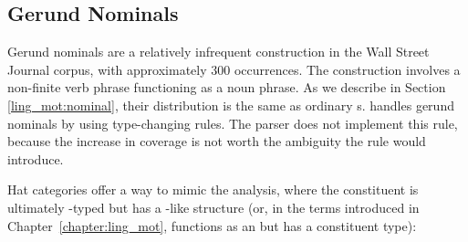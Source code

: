 \subsection{Gerund Nominals}

Gerund nominals are a relatively infrequent construction in the Wall Street
Journal corpus, with approximately 300 occurrences. The construction involves a
non-finite verb phrase functioning as a noun phrase. As we describe in Section
\ref{ling_mot:nominal}, their distribution is the same as ordinary s.
\ccgbank handles gerund nominals by using 
type-changing rules. The \candc parser does not implement this rule, because
the increase in coverage is not worth the ambiguity the rule would introduce.

Hat categories offer a way to mimic the \ltag analysis, where the constituent is
ultimately -typed but has a -like structure (or, in the terms
introduced in Chapter~\ref{chapter:ling_mot}, functions as an  but has a
 constituent type):

\begin{center}
\end{center}

